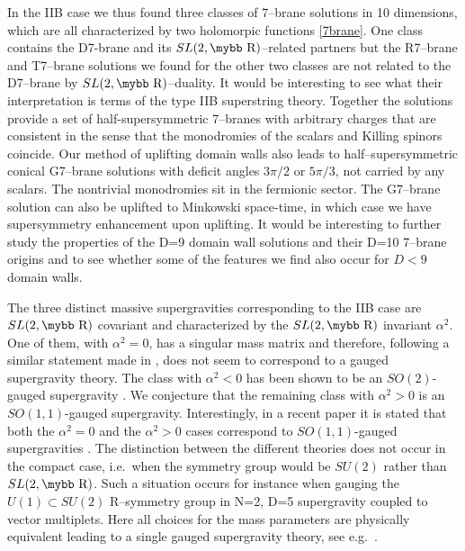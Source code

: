 \documentclass[12pt,a4paper]{article}
\def\bb#1{\hbox{\mybb#1}}
\begin{document}
In the IIB case we thus found three classes of 7--brane solutions in 10
dimensions, which are all characterized by two holomorpic functions
\eqref{7brane}. One class contains the D7-brane and its $SL(2,\bb{R})$--related
partners but the R7--brane and T7--brane solutions we found for the
other two classes are not related to the
D7--brane by $SL(2,\bb{R})$--duality. It would be interesting to
see what their interpretation is terms of the type IIB superstring theory.
Together the solutions provide a set of half-supersymmetric
7--branes with arbitrary charges that are consistent in the sense that
the monodromies of the scalars and Killing spinors coincide.
Our method of uplifting domain walls also leads to half--supersymmetric 
conical G7--brane solutions
with deficit angles $3\pi/2$ or $5\pi/3$, not carried by any scalars.
The nontrivial monodromies sit in the fermionic sector. The G7--brane 
solution can also be uplifted to Minkowski space-time, in which case we
have supersymmetry enhancement upon uplifting.
It would be interesting to further study the properties of
the D=9 domain wall solutions and their D=10 7--brane origins and to see
whether some of the features we find also occur for $D<9$ domain walls.

The three distinct massive supergravities corresponding to the IIB case are
$SL(2,\bb{R})$ covariant and characterized by the $SL(2,\bb{R})$
invariant $\alpha^2$. One of them, with $\alpha^2 = 0$, has a singular
mass matrix and therefore, following a similar statement made in
\cite{Alonso-Alberca:2000gh}, does not seem to correspond to a gauged
supergravity theory.
The class with $\alpha^2 < 0$ has been shown to be an
$SO(2)$-gauged supergravity \cite{Cowdall:2000sq}. We conjecture
that the remaining class with $\alpha^2 >0$ is an $SO(1,1)$-gauged
supergravity. Interestingly, in a recent paper it is stated that both
the $\alpha^2 = 0$ and the $\alpha^2>0$ cases correspond to
$SO(1,1)$-gauged supergravities \cite{Hull:2002wg}.
The distinction between the different theories does not occur in the
compact case,
i.e.~when the symmetry group would be $SU(2)$ rather than $SL(2,\bb{R})$.
Such a situation occurs for instance when gauging the $U(1) \subset SU(2)$
R--symmetry group in N=2, D=5 supergravity coupled to vector
multiplets. Here all choices for the mass parameters are physically
equivalent leading to a single gauged supergravity theory,
see e.g.~\cite{Bergshoeff:2000zn}.
\end{document}
